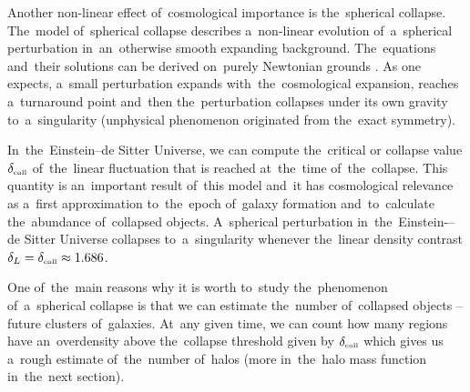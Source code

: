 Another non-linear effect of~cosmological importance is the~spherical collapse. The~model of~spherical collapse describes a~non-linear evolution of~a~spherical perturbation in~an~otherwise smooth expanding background. The~equations and~their solutions can be derived on~purely Newtonian grounds \parencite{2010deto.book.....A}. As one expects, a~small perturbation expands with~the~cosmological expansion, reaches a~turnaround point and~then the~perturbation collapses under its own gravity to~a~singularity (unphysical phenomenon originated from the~exact symmetry).

In~the~Einstein--de Sitter Universe, we can compute the~critical or collapse value $\delta_\text{\tiny coll}$ of~the~linear fluctuation that is reached at~the~time of~the~collapse. This quantity is an~important result of~this model and~it has cosmological relevance as a~first approximation to~the~epoch of~galaxy formation and~to~calculate the~abundance of~collapsed objects. A~spherical perturbation in~the~Einstein-–de Sitter Universe collapses to~a~singularity whenever the~linear density contrast $\delta_L=\delta_\text{\tiny coll}\approx1.686$.

One of~the~main reasons why it is worth to~study the~phenomenon of~a~spherical collapse is that we can estimate the~number of~collapsed objects -- future clusters of~galaxies. At~any given time, we can count how many regions have an~overdensity above the~collapse threshold given by $\delta_\text{\tiny coll}$ which gives us a~rough estimate of~the~number of~halos (more in~the~halo mass function in~the~next section).
